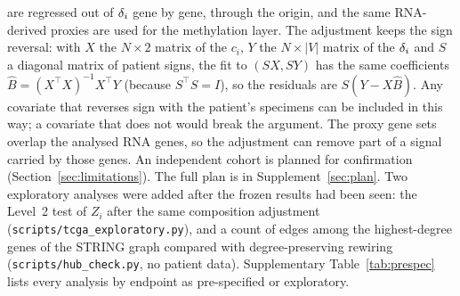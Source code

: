 are regressed out of $\delta_i$ gene by gene, through the origin, and the same RNA-derived proxies are used for the methylation layer. The adjustment keeps the sign reversal: with $X$ the $N\times2$ matrix of the $c_i$, $Y$ the $N\times|V|$ matrix of the $\delta_i$ and $S$ a diagonal matrix of patient signs, the fit to $(SX,SY)$ has the same coefficients $\hat B=(X^\top X)^{-1}X^\top Y$ (because $S^\top S=I$), so the residuals are $S(Y-X\hat B)$. Any covariate that reverses sign with the patient's specimens can be included in this way; a covariate that does not would break the argument. The proxy gene sets overlap the analysed RNA genes, so the adjustment can remove part of a signal carried by those genes. An independent cohort is planned for confirmation (Section~\ref{sec:limitations}). The full plan is in Supplement~\ref{sec:plan}. Two exploratory analyses were added after the frozen results had been seen: the Level~2 test of $Z_i$ after the same composition adjustment (\texttt{scripts/tcga\_exploratory.py}), and a count of edges among the highest-degree genes of the STRING graph compared with degree-preserving rewiring (\texttt{scripts/hub\_check.py}, no patient data). Supplementary Table~\ref{tab:prespec} lists every analysis by endpoint as pre-specified or exploratory.
